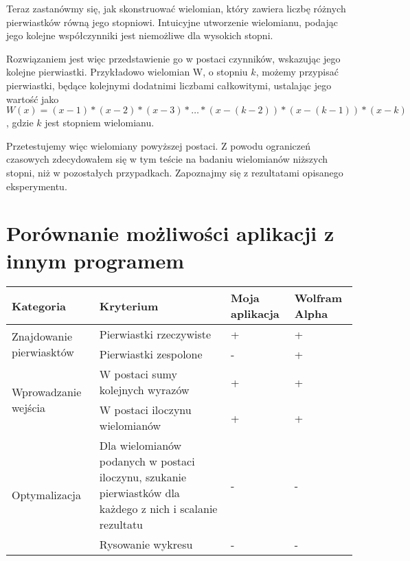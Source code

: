 \documentclass[twoside,a4paper]{book}
\begin{document}
Teraz zastanówmy się, jak skonstruować wielomian, który zawiera liczbę różnych pierwiastków równą jego stopniowi. Intuicyjne utworzenie wielomianu, podając jego kolejne współczynniki jest niemożliwe dla wysokich stopni.

Rozwiązaniem jest więc przedstawienie go w postaci czynników, wskazując jego kolejne pierwiastki. Przykładowo wielomian W, o stopniu $k$, możemy przypisać pierwiastki, będące kolejnymi dodatnimi liczbami całkowitymi, ustalając jego wartość jako $W(x)=(x-1)*(x-2)*(x-3)*…*(x-(k-2))*(x-(k-1))*(x-k)$, gdzie $k$ jest stopniem wielomianu.

Przetestujemy więc wielomiany powyższej postaci. Z powodu ograniczeń czasowych zdecydowałem się w tym teście na badaniu wielomianów niższych stopni, niż w pozostałych przypadkach. Zapoznajmy się z rezultatami opisanego eksperymentu.


\section {Porównanie możliwości aplikacji z innym programem}

\begin{center}
	\begin{tabular}{ |p{2cm}|p{8cm}|p{1.5cm}|p{1.5cm}| } 
		\hline
		Kategoria & Kryterium & Moja aplikacja & Wolfram Alpha \\
		\hline
		\multirow{2}{4em}{Znajdowanie pierwiasktów}
		& Pierwiastki rzeczywiste & + & + \\ 
		& Pierwiastki zespolone & - & + \\
		\hline
		\multirow{2}{4em}{Wprowadzanie wejścia}
		&W postaci sumy kolejnych wyrazów & + & + \\
		&W postaci iloczynu wielomianów & + & + \\
		\hline
		\multirow{2}{4em}{Optymalizacja}
		&Dla wielomianów podanych w postaci iloczynu, szukanie pierwiastków dla każdego z nich i scalanie rezultatu & - & - \\
		&Rysowanie wykresu & - & - \\
		\hline
	\end{tabular}
\end{center}
\end{document}
